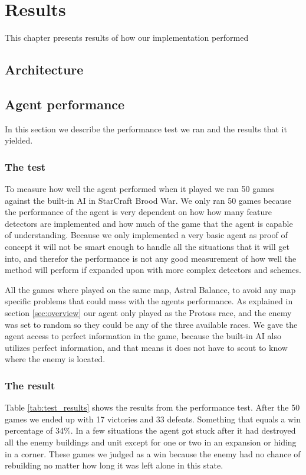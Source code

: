 
\chapter{Results}
This chapter presents results of how our implementation performed
\section{Architecture}
\label{sec:architecture}

\section{Agent performance}
In this section we describe the performance test we ran and the results that it yielded.
\subsection{The test}
To measure how well the agent performed when it played  we ran 50 games against the built-in AI in StarCraft Brood War. We only ran 50 games because the performance of the agent is very dependent on how how many feature detectors are implemented and how much of the game that the agent is capable of understanding. Because we only implemented a very basic agent as proof of concept it will not be smart enough to handle all the situations that it will get into, and therefor the performance is not any good measurement of how well the method will perform if expanded upon with more complex detectors and schemes. 
	
All the games where played on the same map, Astral Balance, to avoid any map specific problems that could mess with the agents performance. As explained in section \ref{sec:overview} our agent only played as the Protoss race, and the enemy was set to random so they could be any of the three available races. We gave the agent access to perfect information in the game, because the built-in AI also utilizes perfect information, and that means it does not have to scout to know where the enemy is located.

\subsection{The result}
Table \ref{tab:test_results} shows the results from the performance test. After the 50 games we ended up with 17 victories and 33 defeats. Something that equals a win percentage of 34\%. In a few situations the agent got stuck after it had destroyed all the enemy buildings and unit except for one or two in an expansion or hiding in a corner. These games we judged as a win because the enemy had no chance of rebuilding no matter how long it was left alone in this state.

